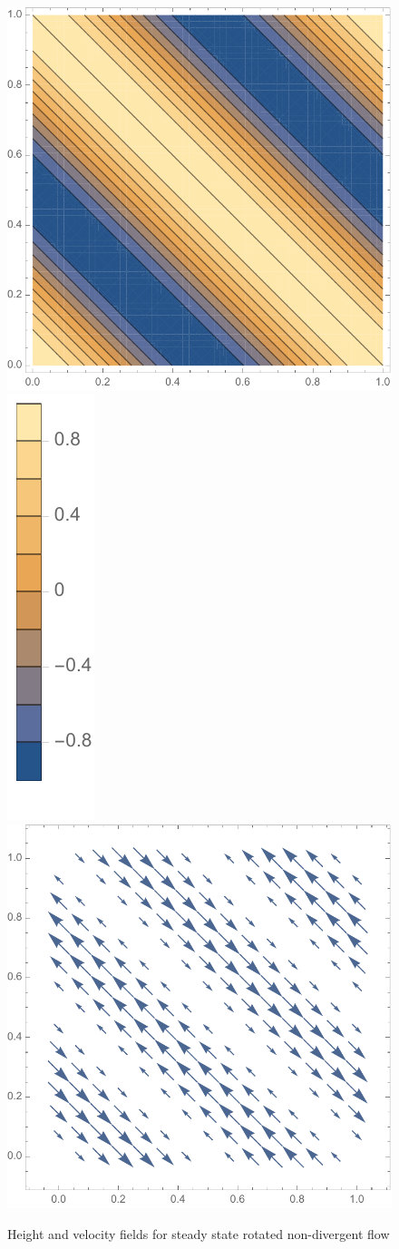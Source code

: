 \documentclass[10pt,a4paper]{article}
\begin{document}
\begin{figure}
\centering
\includegraphics[scale=0.4]{geobalance_rotated_h.pdf} \includegraphics[scale=0.4]{geobalance_rotated_hscale.pdf} \hspace{1cm}\includegraphics[scale=0.4]{geobalance_rotated_uv.pdf} 
\caption{Height and velocity fields for steady state rotated non-divergent flow}
\end{figure}

\sub
\end{document}
